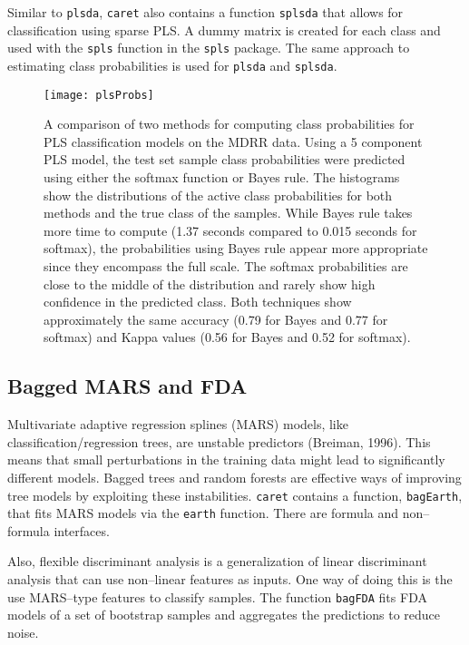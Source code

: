 \documentclass[12pt]{article}
\begin{document}
Similar to \texttt{plsda}, \texttt{caret} also contains a function \texttt{splsda} that allows for classification using sparse PLS. A dummy 
matrix is created for each class and used with the \texttt{spls} function in the \texttt{spls} package. The same approach to estimating class probabilities is used for \texttt{plsda} and \texttt{splsda}.


\begin{figure}
   \begin{center}		
      \texttt{[image: plsProbs]}
\caption{A comparison of two methods for computing class probabilities for PLS classification models on the MDRR data. Using a 5 component PLS model, the test set sample class probabilities were predicted using either the softmax function or Bayes rule. The histograms show the distributions of the active class probabilities for both methods and the true class of the samples. While Bayes rule takes more time to compute (1.37 seconds compared to 0.015 seconds for softmax), the probabilities using Bayes rule appear more appropriate since they encompass the full scale. The softmax probabilities are close to the middle of the distribution and rarely show high confidence in the predicted class. Both techniques show approximately the same accuracy (0.79 for Bayes and 0.77 for softmax) and Kappa values (0.56 for Bayes and 0.52 for softmax).}
      \label{f:plsProbs}       
   \end{center}
\end{figure}  

\subsection{Bagged MARS and FDA}

Multivariate adaptive regression splines (MARS) models, like classification/regression trees, are unstable predictors (Breiman, 1996). This means that small perturbations in the training data might lead to significantly different models. Bagged trees and random forests are effective ways of improving tree models by exploiting these instabilities. \texttt{caret} contains a function, \texttt{bagEarth}, that fits MARS models via the \texttt{earth} function. There are formula and non--formula interfaces. 

Also, flexible discriminant analysis is a generalization of linear discriminant analysis that can use non--linear features as inputs. One way of doing this is the use MARS--type features to classify samples. The function \texttt{bagFDA} fits FDA models of a set of bootstrap samples and aggregates the predictions to reduce noise.  
\end{document}
